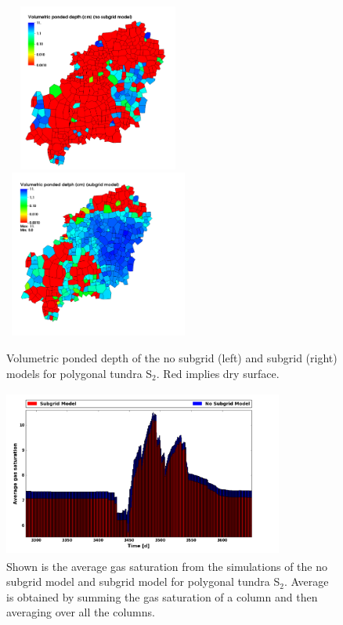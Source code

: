 \documentclass[review,11pt]{elsarticle}
\begin{document}
\begin{figure}[!h]
\centering 
\includegraphics[width=6.2cm, height=5.5cm]{./figures/MDM/VPD-NSG-10yr-165d.png}
\includegraphics[width=6.2cm, height=5.5cm]{./figures/MDM/VPD-Mrun4SG-10yr-165d.png} 
\caption{Volumetric ponded depth of the no subgrid (left) and subgrid (right) models for polygonal tundra S$_2$. Red implies dry surface.}
\label{volumetric-pd}
\end{figure}

\begin{figure}[!h]
\centering 
\includegraphics[width=9.2cm, height=5.5cm]{./figures/MDM/GS-Mrun1SG-10yr.png}
\caption{Shown is the average gas saturation from the simulations of the no subgrid model and subgrid model for polygonal tundra S$_2$. Average is obtained by summing the gas saturation of a column and then averaging over all the columns.}
\label{gas-saturation}
\end{figure}
\end{document}
